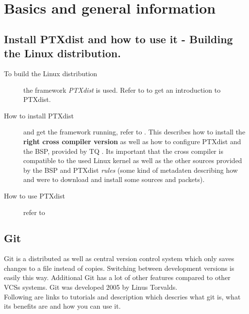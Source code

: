 \chapter{Basics and general information}%
\label{cha:Basics and general information}


\section{Install PTXdist and how to use it - Building the Linux distribution. }%
\label{sec:Building the Linux distribution}

\begin{description}
    \item[To build the Linux distribution] the framework \textit{PTXdist} is
        used. Refer to \cite{PTXdist} to get an introduction to PTXdist.
    \item[How to install PTXdist] and get the framework running, refer to
        \cite{install_ptxdist}. This describes how to install the
        \textbf{right cross compiler version} as well as how to configure
        PTXdist and the BSP, provided by TQ \cite[TQ BSP]{BSP_119}. Its
        important that the cross compiler is compatible to the used Linux kernel
        as well as the other sources provided by the BSP and PTXdist
        \textit{rules} (some kind of \gls{metadaten} describing how and were to
        download and install some sources and packets).
    \item[How to use PTXdist] refer to \cite[PTXdist manual]{ptxdist_manual}
\end{description}


\section{Git}%
\label{sec:Building the Linux distribution}
Git is a distributed as well as central version control system which only saves
changes to a file instead of copies. Switching between development versions is
easily this way. Additional Git has a lot of other features compared to other
\glspl{VCS} systems. Git was developed 2005 by Linus Torvalds.
\\
Following are links to tutorials and description which
descries what git is, what its benefits are  and how you can use it.


